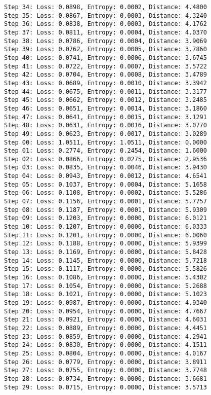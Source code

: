 \documentclass[11pt]{article}
\begin{document}
\begin{Verbatim}[commandchars=\\\{\}]
Step 34: Loss: 0.0898, Entropy: 0.0002, Distance: 4.4800
Step 35: Loss: 0.0867, Entropy: 0.0003, Distance: 4.3240
Step 36: Loss: 0.0838, Entropy: 0.0003, Distance: 4.1762
Step 37: Loss: 0.0811, Entropy: 0.0004, Distance: 4.0370
Step 38: Loss: 0.0786, Entropy: 0.0004, Distance: 3.9069
Step 39: Loss: 0.0762, Entropy: 0.0005, Distance: 3.7860
Step 40: Loss: 0.0741, Entropy: 0.0006, Distance: 3.6745
Step 41: Loss: 0.0722, Entropy: 0.0007, Distance: 3.5722
Step 42: Loss: 0.0704, Entropy: 0.0008, Distance: 3.4789
Step 43: Loss: 0.0689, Entropy: 0.0010, Distance: 3.3942
Step 44: Loss: 0.0675, Entropy: 0.0011, Distance: 3.3177
Step 45: Loss: 0.0662, Entropy: 0.0012, Distance: 3.2485
Step 46: Loss: 0.0651, Entropy: 0.0014, Distance: 3.1860
Step 47: Loss: 0.0641, Entropy: 0.0015, Distance: 3.1291
Step 48: Loss: 0.0631, Entropy: 0.0016, Distance: 3.0770
Step 49: Loss: 0.0623, Entropy: 0.0017, Distance: 3.0289
Step 00: Loss: 1.0511, Entropy: 1.0511, Distance: 0.0000
Step 01: Loss: 0.2774, Entropy: 0.2454, Distance: 1.6000
Step 02: Loss: 0.0866, Entropy: 0.0275, Distance: 2.9536
Step 03: Loss: 0.0835, Entropy: 0.0046, Distance: 3.9430
Step 04: Loss: 0.0943, Entropy: 0.0012, Distance: 4.6541
Step 05: Loss: 0.1037, Entropy: 0.0004, Distance: 5.1658
Step 06: Loss: 0.1108, Entropy: 0.0002, Distance: 5.5286
Step 07: Loss: 0.1156, Entropy: 0.0001, Distance: 5.7757
Step 08: Loss: 0.1187, Entropy: 0.0001, Distance: 5.9309
Step 09: Loss: 0.1203, Entropy: 0.0000, Distance: 6.0121
Step 10: Loss: 0.1207, Entropy: 0.0000, Distance: 6.0333
Step 11: Loss: 0.1201, Entropy: 0.0000, Distance: 6.0060
Step 12: Loss: 0.1188, Entropy: 0.0000, Distance: 5.9399
Step 13: Loss: 0.1169, Entropy: 0.0000, Distance: 5.8428
Step 14: Loss: 0.1145, Entropy: 0.0000, Distance: 5.7218
Step 15: Loss: 0.1117, Entropy: 0.0000, Distance: 5.5826
Step 16: Loss: 0.1086, Entropy: 0.0000, Distance: 5.4302
Step 17: Loss: 0.1054, Entropy: 0.0000, Distance: 5.2688
Step 18: Loss: 0.1021, Entropy: 0.0000, Distance: 5.1023
Step 19: Loss: 0.0987, Entropy: 0.0000, Distance: 4.9340
Step 20: Loss: 0.0954, Entropy: 0.0000, Distance: 4.7667
Step 21: Loss: 0.0921, Entropy: 0.0000, Distance: 4.6031
Step 22: Loss: 0.0889, Entropy: 0.0000, Distance: 4.4451
Step 23: Loss: 0.0859, Entropy: 0.0000, Distance: 4.2941
Step 24: Loss: 0.0830, Entropy: 0.0000, Distance: 4.1511
Step 25: Loss: 0.0804, Entropy: 0.0000, Distance: 4.0167
Step 26: Loss: 0.0779, Entropy: 0.0000, Distance: 3.8911
Step 27: Loss: 0.0755, Entropy: 0.0000, Distance: 3.7748
Step 28: Loss: 0.0734, Entropy: 0.0000, Distance: 3.6681
Step 29: Loss: 0.0715, Entropy: 0.0000, Distance: 3.5713

\end{Verbatim}
\end{document}
